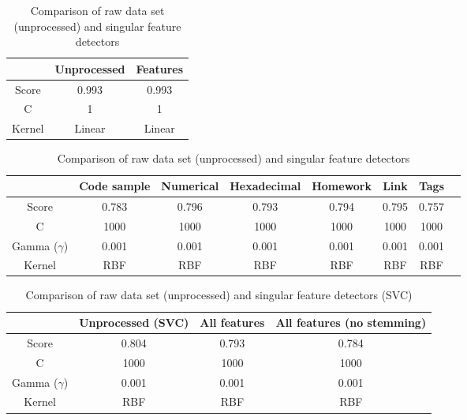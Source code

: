 \begin{comment}
Potentially move "all this failed and went wrong" here
\end{comment}



\begin{table}[tbp]
	\centering
	\begin{tabular}{| c | c | c |}
		\hline
		~ 			& Unprocessed		& Features	\\ \hline
		Score 		& 0.993				& 0.993		\\ \hline
		C			& 1					& 1			\\ \hline
		Kernel		& Linear			& Linear	\\ \hline
	\end{tabular}
	\caption{Comparison of raw data set (unprocessed) and singular feature detectors}
	\label{tab:singular_feature_detector_tex}
\end{table}

\begin{table}[tbp]
	\centering
	\begin{tabular}{| c | c | c | c | c | c | c | c |}
		\hline
		~ 					& Code sample	& Numerical		& Hexadecimal	& Homework		& Link 		& Tags	\\ \hline
		Score 				& 0.783			& 0.796			& 0.793			& 0.794			& 0.795 	& 0.757	\\ \hline
		C					& 1000			& 1000			& 1000			& 1000			& 1000 		& 1000	\\ \hline
		Gamma ($\gamma$)	& 0.001			& 0.001			& 0.001			& 0.001			& 0.001 	& 0.001	\\ \hline
		Kernel				& RBF			& RBF			& RBF			& RBF			& RBF 		& RBF	\\ \hline
	\end{tabular}
	\caption{Comparison of raw data set (unprocessed) and singular feature detectors}
	\label{tab:singular_feature_detector_so}
\end{table}

\begin{table}[tbp]
	\centering
	\begin{tabular}{| c | c | c | c |}
		\hline
		~ 					& Unprocessed (SVC)	& All features	& All features (no stemming)	\\ \hline
		Score 				& 0.804				& 0.793			& 0.784							\\ \hline
		C					& 1000				& 1000			& 1000							\\ \hline
		Gamma ($\gamma$)	& 0.001				& 0.001			&  0.001							\\ \hline
		Kernel				& RBF				& RBF			& RBF							\\ \hline
	\end{tabular}
	\caption{Comparison of raw data set (unprocessed) and singular feature detectors (SVC)}
	\label{tab:unprocessed_vs_all_feature_detectors_svc_so}
\end{table}

